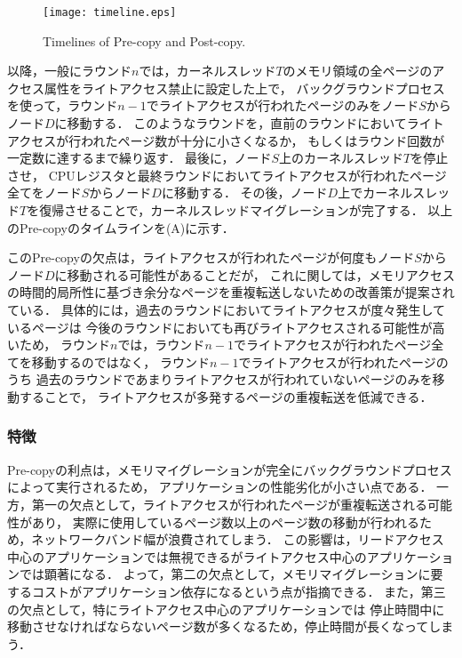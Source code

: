 \documentclass[10pt]{jsarticle}
\begin{document}
\begin{figure}
  \centering
  \texttt{[image: timeline.eps]}
  \caption{Timelines of Pre-copy and Post-copy.}
  \label{fig:timeline}
\end{figure}

以降，一般にラウンド$n$では，カーネルスレッド$T$のメモリ領域の全ページのアクセス属性をライトアクセス禁止に設定した上で，
バックグラウンドプロセスを使って，ラウンド$n-1$でライトアクセスが行われたページのみをノード$S$からノード$D$に移動する．
このようなラウンドを，直前のラウンドにおいてライトアクセスが行われたページ数が十分に小さくなるか，
もしくはラウンド回数が一定数に達するまで繰り返す．
最後に，ノード$S$上のカーネルスレッド$T$を停止させ，
CPUレジスタと最終ラウンドにおいてライトアクセスが行われたページ全てをノード$S$からノード$D$に移動する．
その後，ノード$D$上でカーネルスレッド$T$を復帰させることで，カーネルスレッドマイグレーションが完了する．
以上のPre-copyのタイムラインを(A)に示す．

このPre-copyの欠点は，ライトアクセスが行われたページが何度もノード$S$からノード$D$に移動される可能性があることだが，
これに関しては，メモリアクセスの時間的局所性に基づき余分なページを重複転送しないための改善策が提案されている\cite{t2}．
具体的には，過去のラウンドにおいてライトアクセスが度々発生しているページは
今後のラウンドにおいても再びライトアクセスされる可能性が高いため，
ラウンド$n$では，ラウンド$n-1$でライトアクセスが行われたページ全てを移動するのではなく，
ラウンド$n-1$でライトアクセスが行われたページのうち
過去のラウンドであまりライトアクセスが行われていないページのみを移動することで，
ライトアクセスが多発するページの重複転送を低減できる．

\subsubsection{特徴}

Pre-copyの利点は，メモリマイグレーションが完全にバックグラウンドプロセスによって実行されるため，
アプリケーションの性能劣化が小さい点である．
一方，第一の欠点として，ライトアクセスが行われたページが重複転送される可能性があり，
実際に使用しているページ数以上のページ数の移動が行われるため，ネットワークバンド幅が浪費されてしまう．
この影響は，リードアクセス中心のアプリケーションでは無視できるがライトアクセス中心のアプリケーションでは顕著になる．
よって，第二の欠点として，メモリマイグレーションに要するコストがアプリケーション依存になるという点が指摘できる．
また，第三の欠点として，特にライトアクセス中心のアプリケーションでは
停止時間中に移動させなければならないページ数が多くなるため，停止時間が長くなってしまう．
\end{document}
